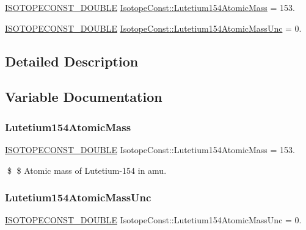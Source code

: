 \begin{DoxyCompactItemize}
\item 
\mbox{\hyperlink{group___isotope_const-_macros_ga8f45a7272ce02c0b4c65c44636ed719a}{I\+S\+O\+T\+O\+P\+E\+C\+O\+N\+S\+T\+\_\+\+D\+O\+U\+B\+LE}} \mbox{\hyperlink{group___isotope_const-_lutetium-_lu154_gad39c5187d3af90848914be8c2f317420}{Isotope\+Const\+::\+Lutetium154\+Atomic\+Mass}} = 153.
\item 
\mbox{\hyperlink{group___isotope_const-_macros_ga8f45a7272ce02c0b4c65c44636ed719a}{I\+S\+O\+T\+O\+P\+E\+C\+O\+N\+S\+T\+\_\+\+D\+O\+U\+B\+LE}} \mbox{\hyperlink{group___isotope_const-_lutetium-_lu154_ga53bd07ca4d46882630f25e9eadc8dcda}{Isotope\+Const\+::\+Lutetium154\+Atomic\+Mass\+Unc}} = 0.
\end{DoxyCompactItemize}


\subsection{Detailed Description}


\subsection{Variable Documentation}
\mbox{\label{group___isotope_const-_lutetium-_lu154_gad39c5187d3af90848914be8c2f317420}} 
\subsubsection{\texorpdfstring{Lutetium154\+Atomic\+Mass}{Lutetium154AtomicMass}}
{\footnotesize\ttfamily \mbox{\hyperlink{group___isotope_const-_macros_ga8f45a7272ce02c0b4c65c44636ed719a}{I\+S\+O\+T\+O\+P\+E\+C\+O\+N\+S\+T\+\_\+\+D\+O\+U\+B\+LE}} Isotope\+Const\+::\+Lutetium154\+Atomic\+Mass = 153.}

\$ \$ Atomic mass of Lutetium-\/154 in amu. \mbox{\label{group___isotope_const-_lutetium-_lu154_ga53bd07ca4d46882630f25e9eadc8dcda}} 
\subsubsection{\texorpdfstring{Lutetium154\+Atomic\+Mass\+Unc}{Lutetium154AtomicMassUnc}}
{\footnotesize\ttfamily \mbox{\hyperlink{group___isotope_const-_macros_ga8f45a7272ce02c0b4c65c44636ed719a}{I\+S\+O\+T\+O\+P\+E\+C\+O\+N\+S\+T\+\_\+\+D\+O\+U\+B\+LE}} Isotope\+Const\+::\+Lutetium154\+Atomic\+Mass\+Unc = 0.}

